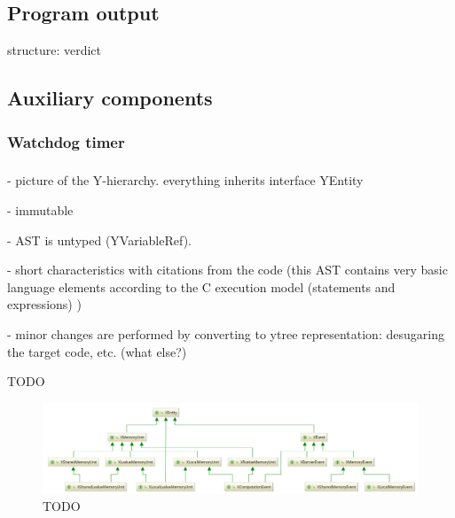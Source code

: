 \subsection{Program output}
\label{ch:impl:out}

structure: verdict




\subsection{Auxiliary components}
\label{ch:impl:aux}

\subsubsection{Watchdog timer}
\label{ch:impl:aux:watchdog}

\subsubsection{}
\label{ch:impl:aux:watchdog}





- picture of the Y-hierarchy. everything inherits interface YEntity

- immutable

- AST is untyped (YVariableRef).

- short characteristics with citations from the code (this AST contains very basic language elements according to the C execution model (statements and expressions) )

- minor changes are performed by converting to ytree representation: desugaring the target code, etc. (what else?)



TODO




\begin{figure}%
  \centering
  \includegraphics[width=\textwidth,height=\textheight,keepaspectratio]{img/my/class-diagrams/XEntity.png}
  \caption{TODO}
  \label{fig:class-diagrams:XEntity}
\end{figure}

